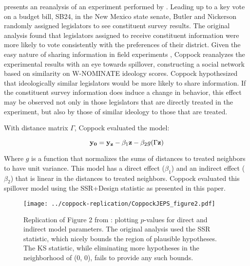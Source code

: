 \citet{coppock2014information} presents an reanalysis of an experiment performed
by \citet{butler2011can}. Leading up to a key vote on a budget bill, SB24, in the
New Mexico state senate, Butler and Nickerson randomly assigned legislators to see
constituent survey results. The original
analysis found that legislators assigned to receive constituent information were
more likely to vote consistently with the preferences of their district.
Given the easy nature of sharing information in
field experiments \citep{winters2012using},  Coppock reanalyzes the
experimental results with an eye towards spillover, constructing a social
network based on similarity on W-NOMINATE ideology scores. Coppock hypothesized
that ideologically similar legislators would be more likely to share
information. If the constituent survey information does induce a change in behavior, this
effect may be observed not only in those legislators that are directly treated
in the experiment, but also by those of similar ideology to those that are
treated.

With distance matrix $\Gamma$, Coppock evaluated the model:

$$\mathbf{y}_{\mathbf{0}} = \mathbf{y}_{\mathbf{z}} - \beta_1 \mathbf{z} - \beta_2 g(\Gamma \mathbf{z})$$

Where $g$ is a function that normalizes the sums of distances to treated
neighbors to have unit variance. This model has a direct
effect ($\beta_1$) and an indirect effect ($\beta_2$) that is linear in the distances to
treated neighbors. Coppock evaluated this spillover model using the SSR+Design statistic as
presented in this paper. 

\begin{figure}[H] \centering
  \texttt{[image: ../coppock-replication/CoppockJEPS\_figure2.pdf]}
  \caption{Replication of Figure 2 from \citet{coppock2014information}: plotting
    $p$-values for direct and indirect model parameters. The
    original analysis used the SSR statistic, which nicely bounds the region of
    plausible hypotheses. The KS statistic, while eliminating more hypotheses in
  the neighborhood of (0, 0), fails to provide any such bounds.}\label{fig:coppock-replication}
\end{figure}


